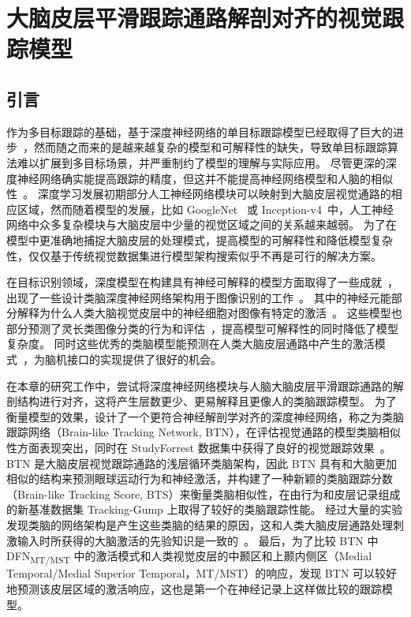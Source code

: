 

\chapter{大脑皮层平滑跟踪通路解剖对齐的视觉跟踪模型}
\label{chap:btn}

\section{引言}
作为多目标跟踪的基础，基于深度神经网络的单目标跟踪模型已经取得了巨大的进步~\cite{ILSVRC15}，然而随之而来的是越来越复杂的模型和可解释性的缺失，导致单目标跟踪算法难以扩展到多目标场景，并严重制约了模型的理解与实际应用。
尽管更深的深度神经网络确实能提高跟踪的精度，但这并不能提高神经网络模型和人脑的相似性~\cite{rajalingham2018large}。
深度学习发展初期部分人工神经网络模块可以映射到大脑皮层视觉通路的相应区域，然而随着模型的发展，比如 GoogleNet~\cite{szegedy2015going} 或 Inception-v4~\cite{szegedy2017inception}中，人工神经网络中众多复杂模块与大脑皮层中少量的视觉区域之间的关系越来越弱。
为了在模型中更准确地捕捉大脑皮层的处理模式，提高模型的可解释性和降低模型复杂性，仅仅基于传统视觉数据集进行模型架构搜索似乎不再是可行的解决方案。


在目标识别领域，深度模型在构建具有神经可解释的模型方面取得了一些成就~\cite{kubilius2019brain-like}，
出现了一些设计类脑深度神经网络架构用于图像识别的工作~\cite{TangSchrimpfLotter2018Recurrent, kar2019evidence}。
其中的神经元能部分解释为什么人类大脑视觉皮层中的神经细胞对图像有特定的激活~\cite{yamins2014performance,khaligh2014deep,gucclu2015deep,murugesan2017brain,cichy2016deep,yamins2016using}。
这些模型也部分预测了灵长类图像分类的行为和评估~\cite{rajalingham2018large,kubilius2016deep}，提高模型可解释性的同时降低了模型复杂度。
同时这些优秀的类脑模型能预测在人类大脑皮层通路中产生的激活模式~\cite{bashivan2019neural}，为脑机接口的实现提供了很好的机会。


在本章的研究工作中，尝试将深度神经网络模块与人脑大脑皮层平滑跟踪通路的解剖结构进行对齐，这将产生层数更少、更易解释且更像人的类脑跟踪模型。
为了衡量模型的效果，设计了一个更符合神经解剖学对齐的深度神经网络，称之为类脑跟踪网络（Brain-like Tracking Network, BTN），在评估视觉通路的模型类脑相似性方面表现突出，同时在 StudyForrest 数据集中获得了良好的视觉跟踪效果~\cite{gaze_forrest}。
BTN 是大脑皮层视觉跟踪通路的浅层循环类脑架构，因此 BTN 具有和大脑更加相似的结构来预测眼球运动行为和神经激活，并构建了一种新颖的类脑跟踪分数（Brain-like Tracking Score, BTS）来衡量类脑相似性，在由行为和皮层记录组成的新基准数据集 Tracking-Gump 上取得了较好的类脑跟踪性能。
经过大量的实验发现类脑的网络架构是产生这些类脑的结果的原因，这和人类大脑皮层通路处理刺激输入时所获得的大脑激活的先验知识是一致的~\cite{TangSchrimpfLotter2018Recurrent, yin2020deep, kar2019evidence}。
最后，为了比较 BTN 中 DFN\textsubscript{MT/MST} 中的激活模式和人类视觉皮层的中颞区和上颞内侧区（Medial Temporal/Medial Superior Temporal，MT/MST）的响应，发现 BTN 可以较好地预测该皮层区域的激活响应，这也是第一个在神经记录上这样做比较的跟踪模型。

